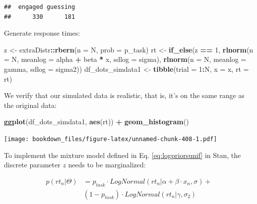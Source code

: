 \documentclass[12pt,]{krantz}
\newenvironment{Shaded}{\begin{snugshade}}{\end{snugshade}}
\newcommand{\KeywordTok}[1]{\textcolor[rgb]{0.13,0.29,0.53}{\textbf{#1}}}
\newcommand{\DataTypeTok}[1]{\textcolor[rgb]{0.13,0.29,0.53}{#1}}
\newcommand{\DecValTok}[1]{\textcolor[rgb]{0.00,0.00,0.81}{#1}}
\newcommand{\StringTok}[1]{\textcolor[rgb]{0.31,0.60,0.02}{#1}}
\newcommand{\OperatorTok}[1]{\textcolor[rgb]{0.81,0.36,0.00}{\textbf{#1}}}
\newcommand{\NormalTok}[1]{#1}
\theoremstyle{definition}
\theoremstyle{definition}
\theoremstyle{definition}
\theoremstyle{remark}
\begin{document}
\begin{verbatim}
##  engaged guessing 
##      330      181
\end{verbatim}

Generate response times:

\begin{Shaded}
\begin{Highlighting}[]
\NormalTok{z <-}\StringTok{ }\NormalTok{extraDistr}\OperatorTok{::}\KeywordTok{rbern}\NormalTok{(}\DataTypeTok{n =}\NormalTok{ N, }\DataTypeTok{prob =}\NormalTok{ p_task)}
\NormalTok{rt <-}\StringTok{ }\KeywordTok{if_else}\NormalTok{(z }\OperatorTok{==}\StringTok{ }\DecValTok{1}\NormalTok{,}
             \KeywordTok{rlnorm}\NormalTok{(}\DataTypeTok{n =}\NormalTok{ N, }\DataTypeTok{meanlog =}\NormalTok{ alpha }\OperatorTok{+}\StringTok{ }\NormalTok{beta }\OperatorTok{*}\StringTok{ }\NormalTok{x, }\DataTypeTok{sdlog =}\NormalTok{ sigma),}
             \KeywordTok{rlnorm}\NormalTok{(}\DataTypeTok{n =}\NormalTok{ N, }\DataTypeTok{meanlog =}\NormalTok{ gamma, }\DataTypeTok{sdlog =}\NormalTok{ sigma2))}
\NormalTok{df_dots_simdata1 <-}\StringTok{ }\KeywordTok{tibble}\NormalTok{(}\DataTypeTok{trial =} \DecValTok{1}\OperatorTok{:}\NormalTok{N, }\DataTypeTok{x =}\NormalTok{ x, }\DataTypeTok{rt =}\NormalTok{ rt)}
\end{Highlighting}
\end{Shaded}

We verify that our simulated data is realistic, that is, it's on the
same range as the original data:

\begin{Shaded}
\begin{Highlighting}[]
\KeywordTok{ggplot}\NormalTok{(df_dots_simdata1, }\KeywordTok{aes}\NormalTok{(rt)) }\OperatorTok{+}
\StringTok{  }\KeywordTok{geom_histogram}\NormalTok{()}
\end{Highlighting}
\end{Shaded}

\texttt{[image: bookdown\_files/figure-latex/unnamed-chunk-408-1.pdf]}

To implement the mixture model defined in Eq. \eqref{eq:logpriorsunif} in
Stan, the discrete parameter \(z\) needs to be marginalized:

\begin{equation}
\begin{aligned}
p(rt_n | \Theta) &= p_{task} \cdot LogNormal(rt_n | \alpha + \beta \cdot x_n, \sigma) +\\ 
    & (1 - p_{task}) \cdot LogNormal(rt_n | \gamma, \sigma_2)
\end{aligned}
\end{equation}
\end{document}
